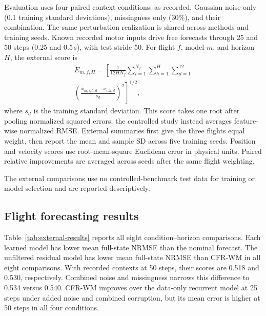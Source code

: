 \documentclass[iicol,pdflatex,sn-basic,Numbered]{sn-jnl}
\newcommand{\ExternalCFRCombinedLongNRMSEMean}{0.540}
\newcommand{\ExternalCFRRecordedLongNRMSEMean}{0.530}
\newcommand{\ExternalUnfilteredCombinedLongNRMSEMean}{0.534}
\newcommand{\ExternalUnfilteredRecordedLongNRMSEMean}{0.518}
\begin{document}
Evaluation uses four paired context conditions: as recorded, Gaussian noise
only (0.1 training standard deviations), missingness only (30\%), and their
combination. The same perturbation realization is shared across methods and
training seeds. Known recorded motor inputs drive free forecasts through
25 and 50 steps (0.25 and 0.5\,s), with test stride 50. For flight $f$, model
$m$, and horizon $H$, the external score is
\begin{equation}
\begin{aligned}
 E_{m,f,H}=\left[\frac{1}{12H N_f}
 \sum_{i=1}^{N_f}\sum_{h=1}^{H}\sum_{d=1}^{12}\right.\\[-0.2em]
 \left.\left(\frac{\widehat{x}_{m,i,h,d}-x_{i,h,d}}{s_d}\right)^2
 \right]^{1/2},
\end{aligned}
 \label{eq:external-score}
\end{equation}
where $s_d$ is the training standard deviation. This score takes one root
after pooling normalized squared errors; the controlled study instead
averages feature-wise normalized RMSE. External summaries first give the
three flights equal weight, then report the mean and sample SD across five
training seeds. Position and velocity scores use root-mean-square Euclidean
error in physical units. Paired relative improvements are averaged across
seeds after the same flight weighting.

The external comparisons use no controlled-benchmark test data for training or
model selection and are reported descriptively.

\subsection{Flight forecasting results}

Table~\ref{tab:external-results} reports all eight condition--horizon
comparisons. Each learned model has lower mean full-state NRMSE than the
nominal forecast. The unfiltered residual model has lower mean full-state
NRMSE than CFR-WM in all eight comparisons. With recorded contexts at 50 steps,
their scores are \ExternalUnfilteredRecordedLongNRMSEMean{} and
\ExternalCFRRecordedLongNRMSEMean{}, respectively. Combined noise and
missingness narrows this difference to
\ExternalUnfilteredCombinedLongNRMSEMean{} versus
\ExternalCFRCombinedLongNRMSEMean{}.
CFR-WM improves over the data-only recurrent model at 25 steps under added
noise and combined corruption, but its mean error is higher at 50 steps
in all four conditions.
\end{document}
